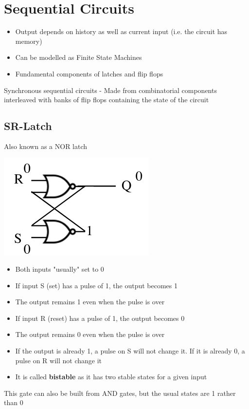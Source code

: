 \documentclass{article}[18pt]
\begin{document}
\section{Sequential Circuits}
\begin{itemize}
	\item Output depends on history as well as current input (i.e. the circuit has memory)
	\item Can be modelled as Finite State Machines
	\item Fundamental components of latches and flip flops
\end{itemize}
Synchronous sequential circuits - Made from combinatorial components interleaved with banks of flip flops containing the state of the circuit
\subsection{SR-Latch}
Also known as a NOR latch
\begin{center}
	\includegraphics[scale=0.7]{SR-Latch}
\end{center}
\begin{itemize}
	\item Both inputs "usually" set to 0
	\item If input S (set) has a pulse of 1, the output becomes 1
	\item The output remains 1 even when the pulse is over
	\item If input R (reset) has a pulse of 1, the output becomes 0
	\item The output remains 0 even when the pulse is over
	\item If the output is already 1, a pulse on S will not change it. If it is already 0, a pulse on R will not change it
	\item It is called \textbf{bistable} as it has two stable states for a given input
\end{itemize}
This gate can also be built from AND gates, but the usual states are 1 rather than 0
\end{document}
